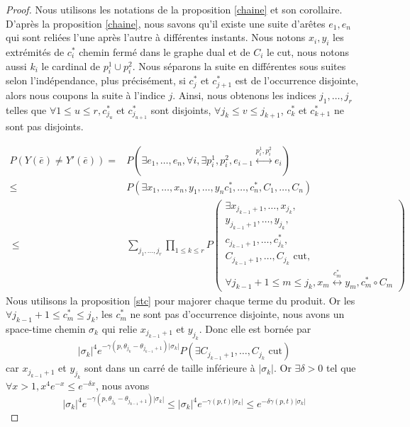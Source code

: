 \documentclass[titlepage,a4paper,12pt]{article}
\newcounter{prop}
\newcounter{cor}
\begin{document}
\begin{proof}

Nous utilisons les notations de la proposition \ref{chaine} et son corollaire.
D'après la proposition \ref{chaine}, nous savons qu'il existe une suite d'arêtes $e_1,e_n$ qui sont reliées l'une après l'autre à différentes instants. Nous notons $x_i,y_i$ les extrémités de $c_i^*$ chemin fermé dans le graphe dual et de $C_i$ le cut, nous notons aussi $k_i$ le cardinal de $p_i^1\cup p_i^2$. Nous séparons la suite en différentes sous suites selon l'indépendance, plus précisément, si $c^*_j$ et $c^*_{j+1}$  est de l'occurrence disjointe, alors nous coupons la suite à l'indice $j$. Ainsi, nous obtenons les indices $j_1,\dots,j_r$ telles que $\forall 1\leqslant u\leqslant r, c^*_{j_u}$ et $c^*_{j_{u+1}}$ sont disjoints, $\forall j_k \leqslant v \leqslant j_{k+1}$, $c_k^*$ et $c_{k+1}^*$ ne sont pas disjoints.

\begin{align*}
P(Y(\bar{e})\neq Y'(\bar{e})) =& P(\exists e_1,\dots,e_n, \forall i, \exists p_i^1,p_i^2, e_{i-1}\overset{p_i^1,p_i^2}{\longleftrightarrow}e_i) \\
 \leqslant &P(\exists x_1,\dots,x_n,y_1,\dots,y_n c^*_1,\dots,c^*_n,C_1,\dots,C_n) \\\
 \leqslant &\sum_{j_1,\dots,j_r}\prod_{1\leqslant k \leqslant r} P\left(\begin{array}{c}
 \exists x_{j_{k-1}+1},\dots,x_{j_k},\\
 y_{j_{k-1}+1},\dots,y_{j_k},\\
 c_{j_{k-1}+1},\dots,c^*_{j_k},\\
 C_{j_{k-1}+1},\dots,C_{j_k} \text{ cut},\\
 \forall j_{k-1}+1 \leqslant m \leqslant j_k, x_m\overset{c^*_m}{\longleftrightarrow} y_m, 
 c^*_m\circ C_m
 \end{array}
 \right)
\end{align*}
Nous utilisons la proposition \ref{stc} pour majorer chaque terme du produit. Or les $\forall j_{k-1}+1 \leqslant c^*_m \leqslant j_k$, les $c^*_m$ ne sont pas d'occurrence disjointe, nous avons un space-time chemin $\sigma_k$ qui relie $x_{j_{k-1}+1}$ et $y_{j_k}$. Donc elle est bornée par $$ \displaystyle |\sigma_k|^4 e^{-\gamma(p,\theta_{j_k}-\theta_{j_{k-1}+1})|\sigma_k|} P(\exists C_{j_{k-1}+1},\dots,C_{j_k} \text{ cut})$$ car $x_{j_{k-1}+1}$ et $y_{j_k}$ sont dans un carré de taille inférieure à $ |\sigma_k|$. Or $\exists \delta>0$ tel que $\forall x>1, x^4e^{-x} \leqslant e^{-\delta x}$, nous avons 
$$|\sigma_k|^4 e^{-\gamma(p,\theta_{j_k}-\theta_{j_{k-1}+1})|\sigma_k|} \leqslant |\sigma_k|^4 e^{-\gamma(p,t)|\sigma_k|} \leqslant e^{-\delta\gamma(p,t)|\sigma_k|}$$


\end{proof}
\end{document}
